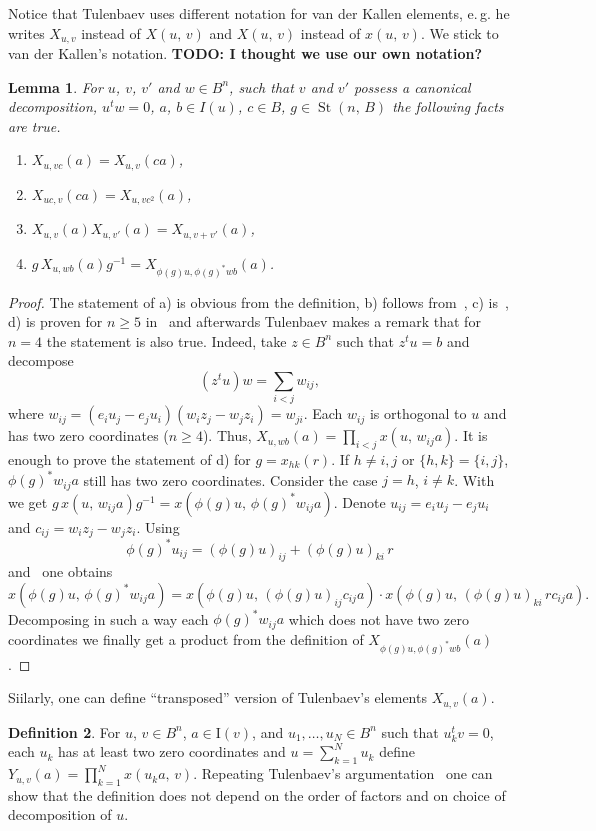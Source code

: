 \documentclass[11pt]{amsart}
\theoremstyle{plain} \declaretheorem[name=Theorem, Refname={Theorem,Theorems}]{tm} \Crefname{tm}{Theorem}{Theorems}
\numberwithin{equation}{section}
\newtheorem{lm}{Lemma} \numberwithin{lm}{section} \Crefname{lm}{Lemma}{Lemmas}
\theoremstyle{definition} \newtheorem{df}[lm]{Definition} \Crefname{df}{Definition}{Definitions}
\theoremstyle{remark} \newtheorem{rk}[lm]{Remark} \Crefname{rk}{Remark}{Remarks}
\newcommand{\St}{\mathop{\mathrm{St}}\nolimits}
\newcommand{\inv}{^{-1}}
\begin{document}
Notice that Tulenbaev uses different notation for van der Kallen elements, e.\,g. he writes $X_{u,v}$ instead of $X(u,\,v)$ and $X(u,\,v)$ instead of $x(u,\,v)$. 
We stick to van der Kallen's notation. \textbf{TODO: I thought we use our own notation?}

\begin{lm}
\label{xproperties}
For $u$, $v$, $v'$ and $w\in B^n$, such that $v$ and $v'$ possess a canonical decomposition, $u^tw=0$, $a$, $b\in I(u)$, $c\in B$, $g\in\St(n,\,B)$ the following facts are true.
\begin{enumerate}
\item $X_{u,vc}(a)=X_{u,v}(ca)$,
\item $X_{uc,v}(ca)=X_{u,vc^2}(a)$,
\item $X_{u,v}(a)X_{u,v'}(a)=X_{u,v+v'}(a)$,
\item $g\,X_{u,wb}(a)g\inv=X_{\phi(g)u,\phi(g)^*wb}(a)$.
\end{enumerate}
\end{lm}

\begin{proof}
The statement of a) is obvious from the definition, b) follows from~\cite[Lem.~1.1\,d)]{Tul}, c) is~\cite[Lem.~1.3\,a)]{Tul}, d) is proven for $n\geq5$ in~\cite[Lem.~1.3\,b)]{Tul} and afterwards Tulenbaev makes a remark that for $n=4$ the statement is also true. Indeed, take $z\in B^n$ such that $z^tu=b$ and decompose
$$
(z^tu)w=\sum_{i<j}w_{ij},
$$
where $w_{ij}=(e_iu_j-e_ju_i)(w_iz_j-w_jz_i)=w_{ji}$. Each $w_{ij}$ is orthogonal to $u$ and has two zero coordinates ($n\geq4$). Thus, $X_{u,wb}(a)=\prod_{i<j}x(u,\,w_{ij}a)$. It is enough to prove the statement of d) for $g=x_{hk}(r)$. If $h\neq i,j$ or $\{h,k\}=\{i,j\}$, $\phi(g)^*w_{ij}a$ still has two zero coordinates. Consider the case $j=h$, $i\neq k$. With~\cite[3.12]{vdK} we get $g\,x(u,\,w_{ij}a)g\inv=x(\phi(g)u,\,\phi(g)^*w_{ij}a)$. Denote $u_{ij}=e_iu_j-e_ju_i$ and $c_{ij}=w_iz_j-w_jz_i$. Using
$$
\phi(g)^*u_{ij}=(\phi(g)u)_{ij}+(\phi(g)u)_{ki}\,r
$$
and~\cite[3.11]{vdK} one obtains
$$
x(\phi(g)u,\,\phi(g)^*w_{ij}a)=x(\phi(g)u,\,(\phi(g)u)_{ij}c_{ij}a)\cdot x(\phi(g)u,\,(\phi(g)u)_{ki}\,rc_{ij}a).
$$
Decomposing in such a way each $\phi(g)^*w_{ij}a$ which does not have two zero coordinates we finally get a product from the definition of $X_{\phi(g)u,\phi(g)^*wb}(a)$.
\end{proof}

Siilarly, one can define ``transposed'' version of Tulenbaev's elements $X_{u,v}(a)$.

\begin{df}
For $u$, $v\in B^n$, $a\in\mathrm I(v)$, and $u_1,\ldots,u_N\in B^n$ such that $u_k^tv=0$, each $u_k$ has at least two zero coordinates and $u=\sum_{k=1}^Nu_k$ define $Y_{u,v}(a)=\prod\limits_{k=1}^Nx(u_ka,\,v)$. Repeating Tulenbaev's argumentation~\cite[p.~3]{Tul} one can show that the definition does not depend on the order of factors and on choice of decomposition of $u$.
\end{df}
\end{document}
